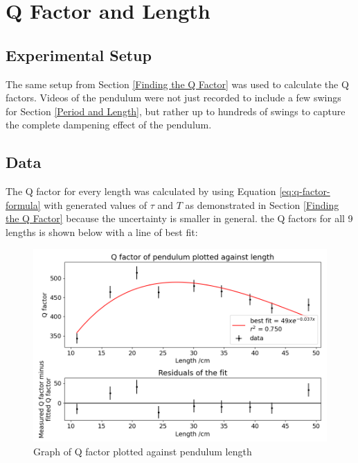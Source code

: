 \documentclass[12pt]{article}
\begin{document}
{\section{Q Factor and Length}

\subsection{Experimental Setup}
The same setup from Section \ref{Finding the Q Factor} was used to calculate the Q factors. Videos of the pendulum were not just recorded to include a few swings for Section \ref{Period and Length}, but rather up to hundreds of swings to capture the complete dampening effect of the pendulum.

\newpage

\subsection{Data}
The Q factor for every length was calculated by using Equation \ref{eq:q-factor-formula} with generated values of $\tau$ and $T$ as demonstrated in Section \ref{Finding the Q Factor} because the uncertainty is smaller in general. the Q factors for all 9 lengths is shown below with a line of best fit:

\begin{figure}[!hptb]
    \centering
    \includegraphics[width=\textwidth]{../figures/qfactor_vs_length.png}
    \caption{\centering Graph of Q factor plotted against pendulum length}
    \label{fig:figure 8}
\end{figure}

}
\end{document}

